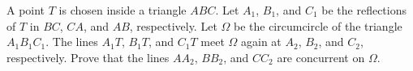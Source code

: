 A point $T$ is chosen inside a triangle $ABC$.
Let $A_1$, $B_1$, and $C_1$ be the reflections of $T$ in $BC$, $CA$, and $AB$, respectively.
Let $\Omega$ be the circumcircle of the triangle $A_1B_1C_1$.
The lines $A_1T$, $B_1T$, and $C_1T$ meet $\Omega$ again at $A_2$, $B_2$, and $C_2$, respectively.
Prove that the lines $AA_2$, $BB_2$, and $CC_2$ are concurrent on $\Omega$.
